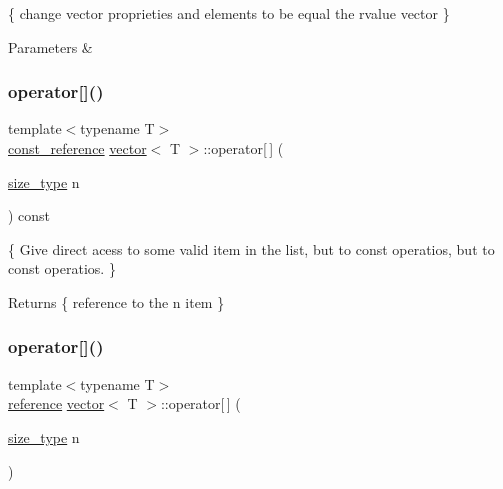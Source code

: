 \{ change vector proprieties and elements to be equal the rvalue vector \} 


\begin{DoxyParams}{Parameters}
{\em } & \\
\hline
\end{DoxyParams}
\mbox{\label{classvector_a8127cc4c6e036ba2f5ee3b9b27f8d24b}} 
\subsubsection{\texorpdfstring{operator[]()}{operator[]()}\hspace{0.1cm}{\footnotesize\ttfamily [1/2]}}
{\footnotesize\ttfamily template$<$typename T$>$ \\
\hyperlink{classvector_aad263433b4072dfbc26ace0df6441960}{const\+\_\+reference} \hyperlink{classvector}{vector}$<$ T $>$\+::operator\mbox{[}$\,$\mbox{]} (\begin{DoxyParamCaption}\item[{\hyperlink{classvector_a4d06f3ade0c2ac023b7a7edb85d9d1ef}{size\+\_\+type}}]{n }\end{DoxyParamCaption}) const\hspace{0.3cm}{\ttfamily [inline]}}



\{ Give direct acess to some valid item in the list, but to const operatios, but to const operatios. \} 

\begin{DoxyReturn}{Returns}
\{ reference to the n item \} 
\end{DoxyReturn}
\mbox{\label{classvector_a8cc9714a4fd45142153af746fe39aeb2}} 
\subsubsection{\texorpdfstring{operator[]()}{operator[]()}\hspace{0.1cm}{\footnotesize\ttfamily [2/2]}}
{\footnotesize\ttfamily template$<$typename T$>$ \\
\hyperlink{classvector_a068ad546247a09ea9dd025658ad69348}{reference} \hyperlink{classvector}{vector}$<$ T $>$\+::operator\mbox{[}$\,$\mbox{]} (\begin{DoxyParamCaption}\item[{\hyperlink{classvector_a4d06f3ade0c2ac023b7a7edb85d9d1ef}{size\+\_\+type}}]{n }\end{DoxyParamCaption})\hspace{0.3cm}{\ttfamily [inline]}}



